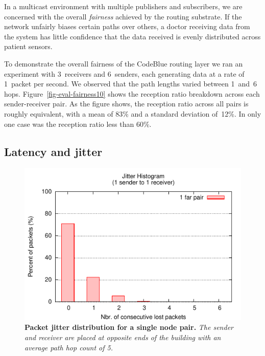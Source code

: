 In a multicast environment with multiple publishers and subscribers,
we are concerned with the overall {\em fairness} achieved by the
routing substrate. If the network unfairly biases certain paths over
others, a doctor receiving data from the system has little confidence
that the data received is evenly distributed across patient sensors.

To demonstrate the overall fairness of the CodeBlue routing layer we
ran an experiment with 3~receivers and 6~senders, each generating data
at a rate of 1~packet per second. We observed that the path lengths
varied between 1~and~6 hops. Figure~\ref{fig-eval-fairness10} shows the
reception ratio breakdown across each sender-receiver pair. As the
figure shows, the reception ratio across all pairs is roughly
equivalent, with a mean of 83\% and a standard deviation of~12\%. In
only one case was the reception ratio less than 60\%.

\subsection{Latency and jitter}
\label{sec-cb-latency}

\begin{figure}[t]
\begin{center}
\includegraphics[width=.6\hsize]{./resources/codeblue-nsdi06/figures/jitter1Send1RecvFar.pdf}
\end{center}
\caption{{\small 
{\bf Packet jitter distribution for a single node pair.}
{\em The sender and receiver are placed at opposite ends of the 
building with an average path hop count of 5.}}}
\label{fig-jitter1Send1RecvFar}
\end{figure}


